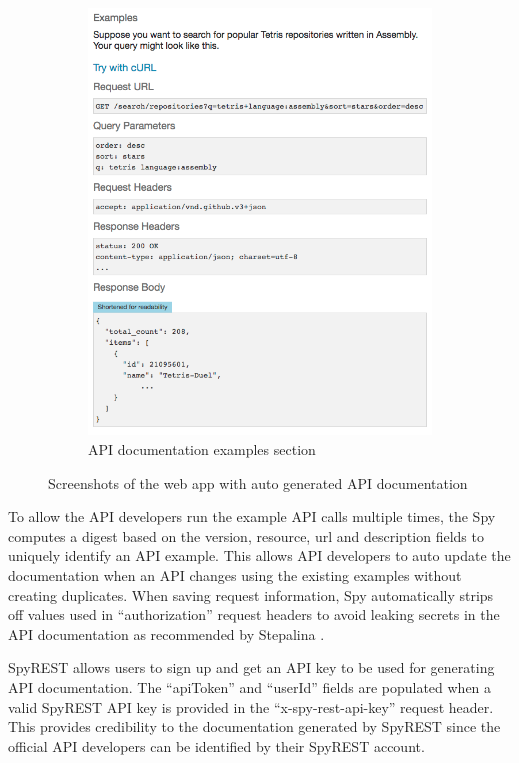 \documentclass[conference]{IEEEtran}
\begin{document}
\begin{figure}[!tbh]
\begin{subfigure}[t]{0.5\textwidth}
    \includegraphics[width=\linewidth]{spyrest_examples.png}
    \caption{API documentation examples section}
    \label{fig:examples}
  \end{subfigure}
  \caption{Screenshots of the web app with auto generated API documentation}
  \label{fig:spyrest_screenshots}
\end{figure}

To allow the API developers run the example API calls multiple times, the Spy computes a digest based on the version, resource, url and description fields to uniquely identify an API example. This allows API developers to auto update the documentation when an API changes using the existing examples without creating duplicates. When saving request information, Spy automatically strips off values used in ``authorization'' request headers to avoid leaking secrets in the API documentation as recommended by Stepalina \cite{Stepalina_saas}.

SpyREST allows users to sign up and get an API key to be used for generating API documentation. The ``apiToken'' and ``userId'' fields are populated when a valid SpyREST API key is provided in the ``x-spy-rest-api-key'' request header. This provides credibility to the documentation generated by SpyREST since the official API developers can be identified by their SpyREST account.
\end{document}
